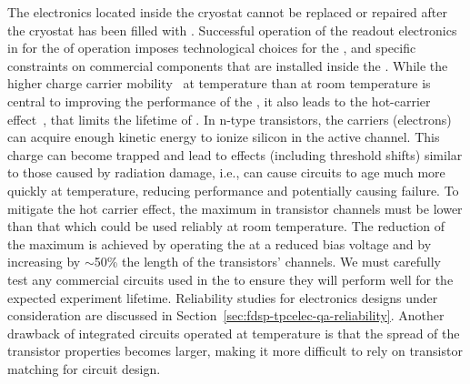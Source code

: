 The electronics located inside the cryostat cannot be replaced or repaired after the
cryostat has been filled with . Successful operation of the readout electronics 
in  for the \dunelifetime of  operation imposes technological 
choices for the  , 
and specific constraints on commercial components that are installed
inside the . While the higher charge carrier 
mobility~\cite{Hairapetian1989} at  temperature than at room
temperature is central to improving the performance of the  , it also leads
to the hot-carrier effect~\cite{Hot-electron}, that limits the lifetime of .
In n-type  transistors, the carriers (electrons)
can acquire enough kinetic energy to ionize silicon in the active channel. This
charge can become trapped and lead to effects (including threshold shifts)
similar to those caused by radiation damage, i.e., can cause 
circuits to age much more quickly at  temperature, 
reducing performance and potentially causing failure. To mitigate the hot carrier effect,
the maximum \efield in transistor channels must be lower than 
that which could be used reliably at room temperature. The reduction of
the maximum \efield is achieved by operating the  at a
reduced bias voltage and by increasing by $\sim$50\% the length 
of the transistors' channels. We must carefully test any commercial 
circuits used in the  to ensure they will perform well for 
the expected experiment lifetime. Reliability studies for 
electronics designs under consideration are discussed in Section~\ref{sec:fdsp-tpcelec-qa-reliability}.
Another drawback of integrated circuits operated at  temperature
is that the spread of the transistor properties becomes larger, making it
more difficult to rely on transistor matching for circuit design.
